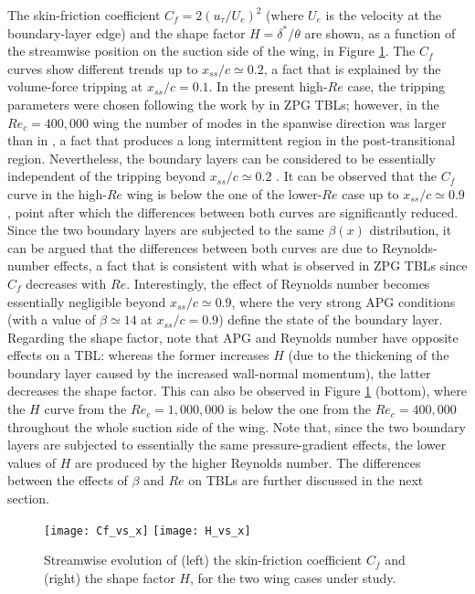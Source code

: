The skin-friction coefficient $C_{f}= 2 \left (u_{\tau} / U_{e} \right )^{2}$ (where $U_{e}$ is the velocity at the boundary-layer edge) and the shape factor $H=\delta^{*} / \theta$ are shown, as a function of the streamwise position on the suction side of the wing, in Figure \ref{Cf_H}. The $C_{f}$ curves show different trends up to $x_{ss}/c \simeq 0.2$, a fact that is explained by the volume-force tripping at $x_{ss}/c=0.1$. In the present high-$Re$ case, the tripping parameters were chosen following the work by \cite{schlatter_orlu12} in ZPG TBLs; however, in the $Re_{c}=400,000$ wing the number of modes in the spanwise direction was larger than in \cite{schlatter_orlu12}, a fact that produces a long intermittent region in the post-transitional region. Nevertheless, the boundary layers can be considered to be essentially independent of the tripping beyond $x_{ss} / c \simeq 0.2$ \citep{vinuesa_diagnostic}. It can be observed that the $C_{f}$ curve in the high-$Re$ wing is below the one of the lower-$Re$ case up to $x_{ss}/c \simeq 0.9$, point after which the differences between both curves are significantly reduced. Since the two boundary layers are subjected to the same $\beta(x)$ distribution, it can be argued that the differences between both curves are due to Reynolds-number effects, a fact that is consistent with what is observed in ZPG TBLs since $C_{f}$ decreases with $Re$. Interestingly, the effect of Reynolds number becomes essentially negligible beyond $x_{ss}/c \simeq 0.9$, where the very strong APG conditions (with a value of $\beta \simeq 14$ at $x_{ss}/c=0.9$) define the state of the boundary layer. Regarding the shape factor, note that APG and Reynolds number have opposite effects on a TBL: whereas the former increases $H$ (due to the thickening of the boundary layer caused by the increased wall-normal momentum), the latter decreases the shape factor. This can also be observed in Figure \ref{Cf_H} (bottom), where the $H$ curve from the $Re_{c}=1,000,000$ is below the one from the $Re_{c}=400,000$ throughout the whole suction side of the wing. Note that, since the two boundary layers are subjected to essentially the same pressure-gradient effects, the lower values of $H$ are produced by the higher Reynolds number. The differences between the effects of $\beta$ and $Re$ on TBLs are further discussed in the next section.
\begin{figure}[t]
\centering
\texttt{[image: Cf\_vs\_x]}
\texttt{[image: H\_vs\_x]}
\caption{Streamwise evolution of (left) the skin-friction coefficient $C_{f}$ and (right) the shape factor $H$, for the two wing cases under study.}
\label{Cf_H}
\end{figure}

